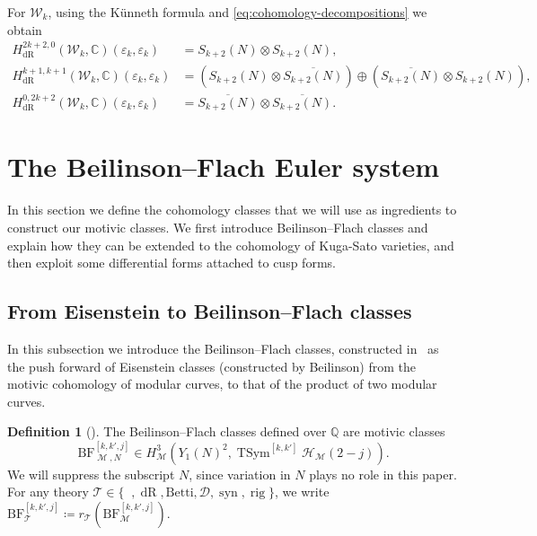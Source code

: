 \documentclass[11pt, a4paper, reqno]{amsart}
\theoremstyle{definition}
\newtheorem{definition}{Definition}[subsection]
\theoremstyle{plain}
\theoremstyle{remark}
\DeclareMathOperator{\TSym}{TSym}
\DeclareMathOperator{\et}{\acute{e}t}
\DeclareMathOperator{\syn}{syn}
\DeclareMathOperator{\rig}{rig}
\DeclareMathOperator{\dR}{dR}
\DeclareMathOperator{\mot}{\mathscr{M}}
\newcommand{\numberset}{\mathbb}
\newcommand{\C}{\numberset{C}}
\newcommand{\Q}{\numberset{Q}}
\renewcommand{\epsilon}{\varepsilon}
\newcommand{\HS}{\mathscr{H}}
\newcommand{\KS}{\mathscr{W}}
\newcommand{\theory}{\mathcal{T}}
\newcommand{\BF}{\mathrm{BF}}
\newcommand{\del}{\mathcal{D}}
\newcommand{\regulator}[1]{r_{#1}}
\begin{document}
  For $\KS_k$, using the K\"unneth formula and \eqref{eq:cohomology-decompositions} we obtain
  \begin{subequations}
   \label{eq:kunneth-components}
   \begin{align}
    H^{2k+2,0}_{\dR}(\KS_k,\C)(\epsilon_k,\epsilon_k) &= S_{k+2}(N)\otimes S_{k+2}(N), \label{eq:hol-kunneth} \\
    H^{k+1,k+1}_{\dR}(\KS_k,\C)(\epsilon_k,\epsilon_k) &= (S_{k+2}(N)\otimes \overline{S_{k+2}(N)}) \oplus (\overline{S_{k+2}(N)} \otimes S_{k+2}(N)), \label{eq:middle-kunneth}\\
    H^{0,2k+2}_{\dR}(\KS_k,\C)(\epsilon_k,\epsilon_k) &= \overline{S_{k+2}(N)} \otimes \overline{S_{k+2}(N)}. \label{eq:nonhol-kunneth}
   \end{align}
  \end{subequations}


\section{The Beilinson--Flach Euler system}

 In this section we define the cohomology classes that we will use as ingredients to construct our motivic classes. We first introduce Beilinson--Flach classes and explain how they can be extended to the cohomology of Kuga-Sato varieties, and then exploit some differential forms attached to cusp forms.

 \subsection{From Eisenstein to Beilinson--Flach classes}

  In this subsection we introduce the Beilinson--Flach classes, constructed in~\cite{leiloefflerzerbes14,KLZ20} as the push forward of Eisenstein classes (constructed by Beilinson) from the motivic cohomology of modular curves, to that of the product of two modular curves.

  \begin{definition}[{\cite[Definition~5.3.1]{KLZ20}}]
   The Beilinson--Flach classes defined over $\Q$ are motivic classes
   \[
    \BF^{[k,k',j]}_{\mot,N} \in H^3_{\mot}(Y_1(N)^2,\TSym^{[k,k']} \HS_{\mot}(2-j)).
   \]
   We will suppress the subscript $N$, since variation in $N$ plays no role in this paper. For any theory $\theory\in\{\et,\dR,\mathrm{Betti},\del,\syn,\rig\}$, we write $\BF^{[k,k',j]}_{\theory} \coloneqq \regulator{\theory}(\BF^{[k,k',j]}_{\mot})$.
  \end{definition}
\end{document}
